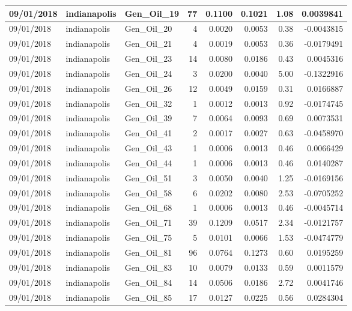 \documentclass[
  letterpaper,
  DIV=11,
  numbers=noendperiod]{scrartcl}
\begin{document}
\begin{tabular}{l|l|l|r|r|r|r|r}
\hline
09/01/2018 & indianapolis & Gen\_Oil\_19 & 77 & 0.1100 & 0.1021 & 1.08 & 0.0039841\\
\hline
09/01/2018 & indianapolis & Gen\_Oil\_20 & 4 & 0.0020 & 0.0053 & 0.38 & -0.0043815\\
\hline
09/01/2018 & indianapolis & Gen\_Oil\_21 & 4 & 0.0019 & 0.0053 & 0.36 & -0.0179491\\
\hline
09/01/2018 & indianapolis & Gen\_Oil\_23 & 14 & 0.0080 & 0.0186 & 0.43 & 0.0045316\\
\hline
09/01/2018 & indianapolis & Gen\_Oil\_24 & 3 & 0.0200 & 0.0040 & 5.00 & -0.1322916\\
\hline
09/01/2018 & indianapolis & Gen\_Oil\_26 & 12 & 0.0049 & 0.0159 & 0.31 & 0.0166887\\
\hline
09/01/2018 & indianapolis & Gen\_Oil\_32 & 1 & 0.0012 & 0.0013 & 0.92 & -0.0174745\\
\hline
09/01/2018 & indianapolis & Gen\_Oil\_39 & 7 & 0.0064 & 0.0093 & 0.69 & 0.0073531\\
\hline
09/01/2018 & indianapolis & Gen\_Oil\_41 & 2 & 0.0017 & 0.0027 & 0.63 & -0.0458970\\
\hline
09/01/2018 & indianapolis & Gen\_Oil\_43 & 1 & 0.0006 & 0.0013 & 0.46 & 0.0066429\\
\hline
09/01/2018 & indianapolis & Gen\_Oil\_44 & 1 & 0.0006 & 0.0013 & 0.46 & 0.0140287\\
\hline
09/01/2018 & indianapolis & Gen\_Oil\_51 & 3 & 0.0050 & 0.0040 & 1.25 & -0.0169156\\
\hline
09/01/2018 & indianapolis & Gen\_Oil\_58 & 6 & 0.0202 & 0.0080 & 2.53 & -0.0705252\\
\hline
09/01/2018 & indianapolis & Gen\_Oil\_68 & 1 & 0.0006 & 0.0013 & 0.46 & -0.0045714\\
\hline
09/01/2018 & indianapolis & Gen\_Oil\_71 & 39 & 0.1209 & 0.0517 & 2.34 & -0.0121757\\
\hline
09/01/2018 & indianapolis & Gen\_Oil\_75 & 5 & 0.0101 & 0.0066 & 1.53 & -0.0474779\\
\hline
09/01/2018 & indianapolis & Gen\_Oil\_81 & 96 & 0.0764 & 0.1273 & 0.60 & 0.0195259\\
\hline
09/01/2018 & indianapolis & Gen\_Oil\_83 & 10 & 0.0079 & 0.0133 & 0.59 & 0.0011579\\
\hline
09/01/2018 & indianapolis & Gen\_Oil\_84 & 14 & 0.0506 & 0.0186 & 2.72 & 0.0041746\\
\hline
09/01/2018 & indianapolis & Gen\_Oil\_85 & 17 & 0.0127 & 0.0225 & 0.56 & 0.0284304\\

\end{tabular}
\end{document}
